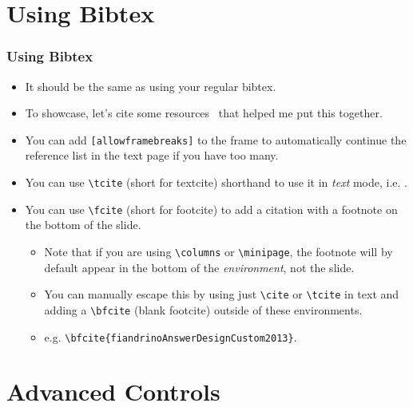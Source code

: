 \documentclass[
	10pt, %
	aspectratio=169, %
]{beamer}
\begin{document}
\section{Using Bibtex}
\begin{frame}
	\frametitle{Using Bibtex}
	\begin{itemize}
		\item It should be the same as using your regular bibtex.
		\item To showcase, let's cite some resources~\cite{anglimAnswerImageFull2010,fiandrinoAnswerDesignCustom2013,kormyloAnswerMakeTikz2017} that helped me put this together.
		\item You can add \texttt{[allowframebreaks]} to the frame to automatically continue the reference list in the text page if you have too many.
		\item You can use \texttt{\textbackslash tcite} (short for textcite) shorthand to use it in \textit{text} mode, i.e. .
		\item You can use \texttt{\textbackslash fcite} (short for footcite) to add a citation with a footnote on the bottom of the slide.
		      \begin{itemize}
			      \item Note that if you are using \texttt{\textbackslash columns} or \texttt{\textbackslash minipage}, the footnote will by default appear in the bottom of the \textit{environment}, not the slide.
			      \item You can manually escape this by using just \texttt{\textbackslash cite} or \texttt{\textbackslash tcite} in text and adding a \texttt{\textbackslash bfcite} (blank footcite) outside of these environments.
			      \item e.g. \texttt{\textbackslash bfcite\{fiandrinoAnswerDesignCustom2013\}}.
		      \end{itemize}
	\end{itemize}
\end{frame}


\section{Advanced Controls}
\end{document}
